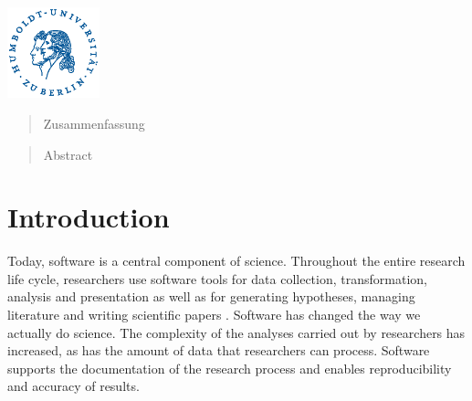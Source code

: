 \documentclass[12pt,a4paper,titlepage,oneside,abstract=true,toc=listof,toc=bibliography]{scrreprt}
\begin{document}
\begin{titlepage}
	\vfill\vfill
	\includegraphics[width=0.2\textwidth]{husiegel_bw_op.eps}\\[1cm] %
	 
	
	\vfill %
	
\end{titlepage}

\def\abstractname{Zusammenfassung}
\begin{abstract}
Zusammenfassung
\end{abstract}

\def\abstractname{Abstract}
\begin{abstract}
Abstract
\end{abstract}

\tableofcontents
\cleardoublepage
\listoffigures                        
\cleardoublepage
\listoftables
\cleardoublepage
{}
\cleardoublepage
\printnomenclature


\chapter{Introduction}
Today, software is a central component of science. Throughout the entire research life cycle, researchers use software tools for data collection, transformation, analysis and presentation as well as for generating hypotheses, managing literature and writing scientific papers \citep{Kethers2017, Pan2016, Wolski2017}. Software has changed the way we actually do science. The complexity of the analyses carried out by researchers has increased, as has the amount of data that researchers can process. Software supports the documentation of the research process and enables reproducibility \citep{Dallmeier-Tiessen2016, Waltemath2016} and accuracy of results.
\end{document}
